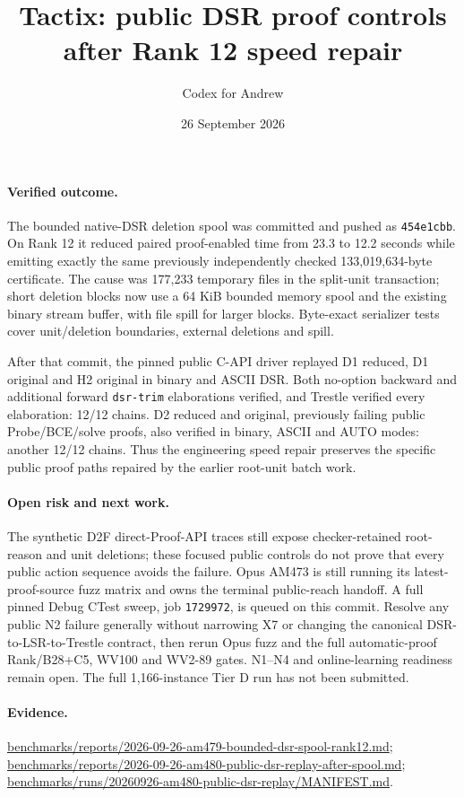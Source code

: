 \documentclass[11pt]{article}
\title{Tactix: public DSR proof controls after Rank 12 speed repair}
\author{Codex for Andrew}
\date{26 September 2026}
\begin{document}
\maketitle

\paragraph{Verified outcome.}
The bounded native-DSR deletion spool was committed and pushed as
\texttt{454e1cbb}. On Rank 12 it reduced paired proof-enabled time from
23.3 to 12.2 seconds while emitting exactly the same previously
independently checked 133,019,634-byte certificate. The cause was
177,233 temporary files in the split-unit transaction; short deletion
blocks now use a 64 KiB bounded memory spool and the existing binary stream
buffer, with file spill for larger blocks. Byte-exact serializer tests cover
unit/deletion boundaries, external deletions and spill.

After that commit, the pinned public C-API driver replayed D1 reduced,
D1 original and H2 original in binary and ASCII DSR. Both no-option
backward and additional forward \texttt{dsr-trim} elaborations verified, and
Trestle verified every elaboration: 12/12 chains. D2 reduced and original,
previously failing public Probe/BCE/solve proofs, also verified in binary,
ASCII and AUTO modes: another 12/12 chains. Thus the engineering speed repair
preserves the specific public proof paths repaired by the earlier root-unit
batch work.

\paragraph{Open risk and next work.}
The synthetic D2F direct-Proof-API traces still expose checker-retained
root-reason and unit deletions; these focused public controls do not prove
that every public action sequence avoids the failure. Opus AM473 is still
running its latest-proof-source fuzz matrix and owns the terminal public-reach
handoff. A full pinned Debug CTest sweep, job \texttt{1729972}, is queued on
this commit. Resolve any public N2 failure generally without narrowing X7 or
changing the canonical DSR-to-LSR-to-Trestle contract, then rerun Opus fuzz and
the full automatic-proof Rank/B28+C5, WV100 and WV2-89 gates. N1--N4 and
online-learning readiness remain open. The full 1,166-instance Tier D run has
not been submitted.

\paragraph{Evidence.}
\url{benchmarks/reports/2026-09-26-am479-bounded-dsr-spool-rank12.md};
\url{benchmarks/reports/2026-09-26-am480-public-dsr-replay-after-spool.md};
\url{benchmarks/runs/20260926-am480-public-dsr-replay/MANIFEST.md}.
\end{document}
